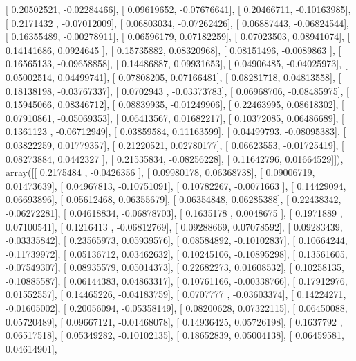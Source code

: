 \documentclass{article}
\begin{document}
       [ 0.20502521, -0.02284466],
       [ 0.09619652, -0.07676641],
       [ 0.20466711, -0.10163985],
       [ 0.2171432 , -0.07012009],
       [ 0.06803034, -0.07262426],
       [ 0.06887443, -0.06824544],
       [ 0.16355489, -0.00278911],
       [ 0.06596179,  0.07182259],
       [ 0.07023503,  0.08941074],
       [ 0.14141686,  0.0924645 ],
       [ 0.15735882,  0.08320968],
       [ 0.08151496, -0.0089863 ],
       [ 0.16565133, -0.09658858],
       [ 0.14486887,  0.09931653],
       [ 0.04906485, -0.04025973],
       [ 0.05002514,  0.04499741],
       [ 0.07808205,  0.07166481],
       [ 0.08281718,  0.04813558],
       [ 0.18138198, -0.03767337],
       [ 0.0702943 , -0.03373783],
       [ 0.06968706, -0.08485975],
       [ 0.15945066,  0.08346712],
       [ 0.08839935, -0.01249906],
       [ 0.22463995,  0.08618302],
       [ 0.07910861, -0.05069353],
       [ 0.06413567,  0.01682217],
       [ 0.10372085,  0.06486689],
       [ 0.1361123 , -0.06712949],
       [ 0.03859584,  0.11163599],
       [ 0.04499793, -0.08095383],
       [ 0.03822259,  0.01779357],
       [ 0.21220521,  0.02780177],
       [ 0.06623553, -0.01725419],
       [ 0.08273884,  0.0442327 ],
       [ 0.21535834, -0.08256228],
       [ 0.11642796,  0.01664529]]), array([[ 0.2175484 , -0.0426356 ],
       [ 0.09980178,  0.06368738],
       [ 0.09006719,  0.01473639],
       [ 0.04967813, -0.10751091],
       [ 0.10782267, -0.0071663 ],
       [ 0.14429094,  0.06693896],
       [ 0.05612468,  0.06355679],
       [ 0.06354848,  0.06285388],
       [ 0.22438342, -0.06272281],
       [ 0.04618834, -0.06878703],
       [ 0.1635178 ,  0.0048675 ],
       [ 0.1971889 ,  0.07100541],
       [ 0.1216413 , -0.06812769],
       [ 0.09288669,  0.07078592],
       [ 0.09283439, -0.03335842],
       [ 0.23565973,  0.05939576],
       [ 0.08584892, -0.10102837],
       [ 0.10664244, -0.11739972],
       [ 0.05136712,  0.03462632],
       [ 0.10245106, -0.10895298],
       [ 0.13561605, -0.07549307],
       [ 0.08935579,  0.05014373],
       [ 0.22682273,  0.01608532],
       [ 0.10258135, -0.10885587],
       [ 0.06144383,  0.04863317],
       [ 0.10761166, -0.00338766],
       [ 0.17912976,  0.01552557],
       [ 0.14465226, -0.04183759],
       [ 0.0707777 , -0.03603374],
       [ 0.14224271, -0.01605002],
       [ 0.20056094, -0.05358149],
       [ 0.08200628,  0.07322115],
       [ 0.06450088,  0.05720489],
       [ 0.09667121, -0.01468078],
       [ 0.14936425,  0.05726198],
       [ 0.1637792 ,  0.06517518],
       [ 0.05349282, -0.10102135],
       [ 0.18652839,  0.05004138],
       [ 0.06459581,  0.04614901],
\end{document}
